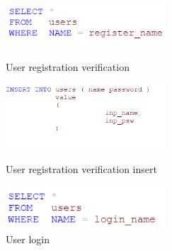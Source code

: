 \begin{CJK*}{UTF8}{gbsn}
\begin{figure}[htbp]
    \centering
    \begin{minipage}[t]{0.32\textwidth}
    \centering
    \includegraphics[width=6cm]{reg_ver.png}
    \caption{User registration verification}
    \end{minipage}
    \begin{minipage}[t]{0.32\textwidth}
    \centering
    \includegraphics[width=6cm]{reg_ins.png}
    \caption{User registration verification insert}
    \end{minipage}
    \begin{minipage}[t]{0.32\textwidth}
    \centering
    \includegraphics[width=6cm]{login.png}
    \caption{User login}
    \end{minipage}  
\end{figure}


\end{CJK*}
